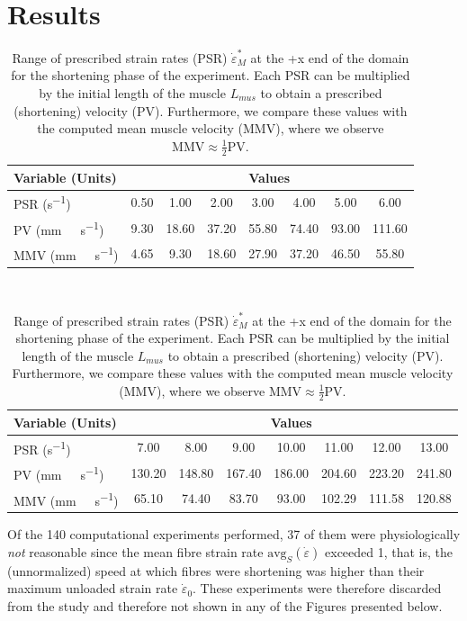 \documentclass{sfuthesis}
\numberwithin{equation}{section}
\numberwithin{figure}{chapter}
\numberwithin{table}{chapter}
\theoremstyle{definition}
\newcommand{\depsilon}{\dot{\varepsilon}}
\begin{document}
\section{Results} \label{sec:gearing_results}

\begin{table}
    \centering
  \begin{tabular}{|l|ccccccc|}
    \hline
    Variable (Units) & \multicolumn{7}{c|}{Values} \\
    \hline
    PSR   (\unit{s^{-1}}) & 0.50 & 1.00  & 2.00  & 3.00  & 4.00  & 5.00  & 6.00   \\
    PV   (\unit{mm \ s^{-1}}) & 9.30 & 18.60 & 37.20 & 55.80 & 74.40 & 93.00 & 111.60 \\
    MMV   (\unit{mm \ s^{-1}}) & 4.65 & 9.30  & 18.60 & 27.90 & 37.20 & 46.50 & 55.80  \\
    \hline
  \end{tabular}\\[1em]
  \begin{tabular}{|l|ccccccc|}
    \hline
    Variable (Units) & \multicolumn{7}{c|}{Values} \\
    \hline
     PSR  (\unit{s^{-1}}) & 7.00   & 8.00   & 9.00   & 10.00  & 11.00   & 12.00   & 13.00   \\
    PV  (\unit{mm \ s^{-1}}) & 130.20 & 148.80 & 167.40 & 186.00 & 204.60  & 223.20  & 241.80  \\
    MMV  (\unit{mm \ s^{-1}}) & 65.10  & 74.40  & 83.70  & 93.00  & 102.29  & 111.58  & 120.88  \\
    \hline
  \end{tabular}
  \caption{Range of prescribed strain rates (PSR) $\depsilon_M^*$ at the +x end of the domain for the shortening phase of the experiment. Each PSR can be multiplied by the initial length of the muscle $L_{mus}$ to obtain a prescribed (shortening) velocity (PV). Furthermore, we compare these values with the computed mean muscle velocity (MMV), where we observe $\mathrm{MMV} \approx \frac{1}{2} \mathrm{PV}$.
  \label{tab:prescribed_strain_rate_mmv}}
\end{table}

Of the 140 computational experiments performed, 37 of them were physiologically \textit{not} reasonable since the mean fibre strain rate $\mathrm{avg}_S(\depsilon)$ exceeded 1, that is, the (unnormalized) speed at which fibres were shortening was higher than their maximum unloaded strain rate $\depsilon_0$. These experiments were therefore discarded from the study and therefore not shown in any of the Figures presented below.
\end{document}
